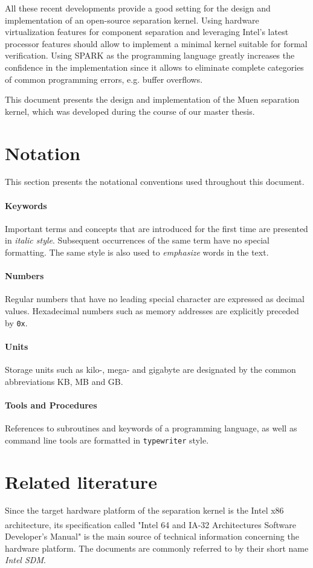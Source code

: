 All these recent developments provide a good setting for the design and
implementation of an open-source separation kernel. Using hardware
virtualization features for component separation and leveraging Intel's latest
processor features should allow to implement a minimal kernel suitable for
formal verification. Using SPARK as the programming language greatly increases
the confidence in the implementation since it allows to eliminate complete
categories of common programming errors, e.g. buffer overflows.

This document presents the design and implementation of the Muen separation
kernel, which was developed during the course of our master thesis.

\section{Notation}
This section presents the notational conventions used throughout this document.

\paragraph{Keywords}
Important terms and concepts that are introduced for the first time are
presented in \emph{italic style}. Subsequent occurrences of the same term have
no special formatting. The same style is also used to \emph{emphasize} words in
the text.

\paragraph{Numbers}
Regular numbers that have no leading special character are expressed as decimal
values. Hexadecimal numbers such as memory addresses are explicitly preceded by
\texttt{0x}.

\paragraph{Units}
Storage units such as kilo-, mega- and gigabyte are designated by
the common abbreviations KB, MB and GB.

\paragraph{Tools and Procedures}
References to subroutines and keywords of a programming language, as well as
command line tools are formatted in \texttt{typewriter} style.

\section{Related literature}
Since the target hardware platform of the separation kernel is the Intel x86
architecture, its specification called "Intel\textsuperscript{\textregistered}
64 and IA-32 Architectures Software Developer's Manual"
\cite{IntelSDM} is the main source of technical information
concerning the hardware platform. The documents are commonly referred to by
their short name \emph{Intel SDM}.

